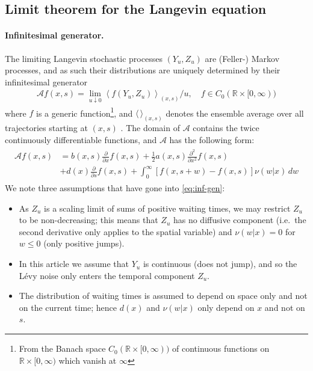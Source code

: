 \documentclass[a4paper,12pt]{article}
\numberwithin{equation}{section}
\theoremstyle{plain}
\theoremstyle{definition}
\theoremstyle{remark}
\numberwithin{equation}{section}
\newcommand{\spc}{\mathbb R}
\newcommand{\spctim}{\spc \times [0,\infty)}
\newcommand{\1}{\mathbf 1}
\newcommand{\del}{\partial}
\begin{document}
\subsection{Limit theorem for the Langevin equation}
\label{subsec:convergence}
\paragraph{Infinitesimal generator.}
The limiting Langevin stochastic processes $(Y_u,Z_u)$ are (Feller-) Markov
processes, and as such their distributions
are uniquely determined by their infinitesimal generator
\begin{align}
\mathcal A f(x,s) = \lim_{u \downarrow 0}
\left \langle f(Y_u, Z_u)\right \rangle_{(x,s)} / u, 
\quad f \in C_0(\spctim)
\end{align}
where $f$ is a generic function\footnote{From the Banach space
$C_0(\spctim)$ of continuous  functions on $\spctim$ which vanish at $\infty$},
and $\langle \, \rangle_{(x,s)}$ denotes the ensemble average over all
trajectories starting at $(x,s)$ \cite{Applebaum}. The domain of $\mathcal A$ contains the twice
continuously differentiable functions, and $\mathcal A$ has the following
form:
\begin{align} \label{eq:inf-gen}
\begin{split}
\mathcal A f(x,s)
&= b(x,s)\frac{\del }{\del x} f(x,s)
+\frac{1}{2} a(x,s) \frac{\del^2}{\del x^2} f(x,s)\\
&+ d(x) \frac{\partial}{\partial s} f(x,s)
+ \int_0^\infty \left[f(x,s+w)-f(x,s)
\right] \nu(w|x)\, dw
\end{split}
\end{align}
We note three assumptions that have gone into \eqref{eq:inf-gen}: 
\begin{itemize}
\item
As $Z_u$ is a scaling limit of sums of positive waiting times,
we may restrict $Z_u$ to be non-decreasing; this means that
$Z_u$ has no diffusive component (i.e.\ the second derivative only applies to 
the spatial variable) and $\nu(w|x) = 0$ for $w \le 0$
(only positive jumps).
\item
In this article we assume that $Y_u$ is continuous (does not jump),
and so the L\'evy noise only enters the temporal component $Z_u$.
\item
The distribution of waiting times is assumed to depend on space only and not
on the current time; hence $d(x)$ and $\nu(w|x)$ only depend on $x$ and not on $s$.
\end{itemize}
\end{document}
